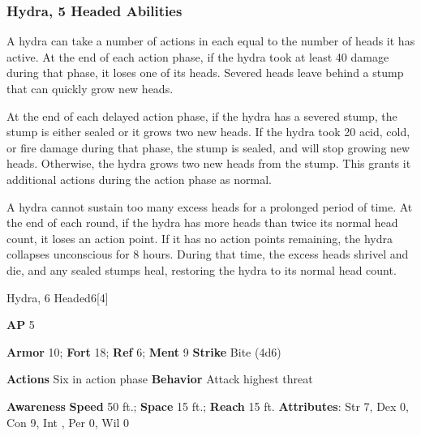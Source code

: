 \subsubsection{Hydra, 5 Headed Abilities}

A hydra can take a number of actions in each  equal to the number of heads it has active.
At the end of each action phase, if the hydra took at least 40 damage during that phase, it loses one of its heads.
Severed heads leave behind a stump that can quickly grow new heads.

At the end of each delayed action phase, if the hydra has a severed stump, the stump is either sealed or it grows two new heads.
If the hydra took 20 acid, cold, or fire damage during that phase, the stump is sealed, and will stop growing new heads.
Otherwise, the hydra grows two new heads from the stump.
This grants it additional actions during the action phase as normal.

A hydra cannot sustain too many excess heads for a prolonged period of time.
At the end of each round, if the hydra has more heads than twice its normal head count, it loses an action point.
If it has no action points remaining, the hydra collapses unconscious for 8 hours.
During that time, the excess heads shrivel and die, and any sealed stumps heal, restoring the hydra to its normal head count.





\begin{monsection}{Hydra, 6 Headed}{6}[4]
\vspace{-1em}\vspace{-1em}
\begin{spellcontent}
\begin{spelltargetinginfo}
{\textbf{AP} 5}

\pari \textbf{Armor} 10;
\textbf{Fort} 18;
\textbf{Ref} 6;
\textbf{Ment} 9
\pari \textbf{Strike} Bite  (4d6)


\pari \textbf{Actions} Six in action phase
\pari \textbf{Behavior} Attack highest threat
\end{spelltargetinginfo}
\end{spellcontent}

\begin{monsterfooter}
\pari \textbf{Awareness} 
\pari \textbf{Speed} 50 ft.;
\textbf{Space} 15 ft.;
\textbf{Reach} 15 ft.
\pari \textbf{Attributes}:
Str 7,
Dex 0,
Con 9,
Int ,
Per 0,
Wil 0
\end{monsterfooter}
\end{monsection}


